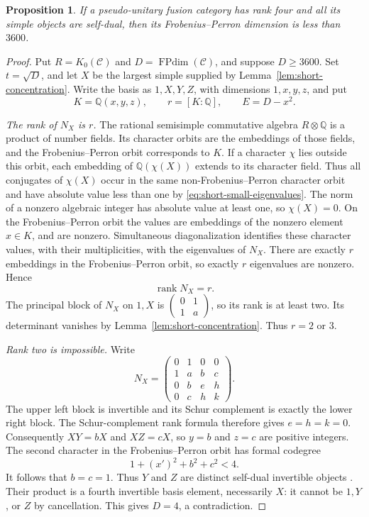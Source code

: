 \documentclass[11pt]{amsart}
\newtheorem{proposition}[theorem]{Proposition}
\theoremstyle{definition}
\DeclareMathOperator{\FPdim}{FPdim}
\newcommand{\Q}{\mathbb Q}
\numberwithin{equation}{section}
\begin{document}
\begin{proposition}\label{prop:pu}
If a pseudo-unitary fusion category has rank four and all its simple objects are self-dual, then its Frobenius--Perron dimension is less than $3600$.
\end{proposition}
\begin{proof}
Put $R=K_0(\mathcal C)$ and $D=\FPdim(\mathcal C)$, and suppose
$D\geq3600$.
Set $t=\sqrt D$, and let $X$ be the largest simple supplied by Lemma~\ref{lem:short-concentration}. Write the basis as $1,X,Y,Z$, with dimensions $1,x,y,z$, and put
\[
 K=\Q(x,y,z),\qquad r=[K:\Q],\qquad E=D-x^2.
\]

\smallskip\noindent
\emph{The rank of $N_X$ is $r$.}
The rational semisimple commutative algebra $R\otimes\Q$ is a product of number fields. Its character orbits are the embeddings of those fields, and the Frobenius--Perron orbit corresponds to $K$. If a character $\chi$ lies outside this orbit, each embedding of
$\Q(\chi(X))$ extends to its character field. Thus all conjugates of
$\chi(X)$ occur in the same non-Frobenius--Perron character orbit and
have absolute value less than one by \eqref{eq:short-small-eigenvalues}.
The norm of a nonzero algebraic integer has absolute value at least one,
so $\chi(X)=0$. On the Frobenius--Perron orbit the values are embeddings of the nonzero element $x\in K$, and are nonzero. Simultaneous diagonalization identifies these
character values, with their multiplicities, with the eigenvalues of
$N_X$. There are exactly $r$ embeddings in the Frobenius--Perron orbit,
so exactly $r$ eigenvalues are nonzero. Hence
\begin{equation}\label{eq:rank-degree}
 \operatorname{rank} N_X=r.
\end{equation}
The principal block of $N_X$ on $1,X$ is
$\left(\begin{smallmatrix}0&1\\1&a\end{smallmatrix}\right)$, so its rank is at least two. Its determinant vanishes by Lemma~\ref{lem:short-concentration}. Thus $r=2$ or $3$.

\smallskip\noindent
\emph{Rank two is impossible.}
Write
\[
 N_X=\begin{pmatrix}
 0&1&0&0\\
 1&a&b&c\\
 0&b&e&h\\
 0&c&h&k
 \end{pmatrix}.
\]
The upper left block is invertible and its Schur complement is exactly the lower right block. The Schur-complement rank formula \cite[\S0.8.5(b)]{HornJohnson}
therefore gives $e=h=k=0$. Consequently $XY=bX$ and $XZ=cX$, so $y=b$ and $z=c$ are positive integers. The second character in the Frobenius--Perron orbit has formal codegree
\[
 1+(x')^2+b^2+c^2<4.
\]
It follows that $b=c=1$. Thus $Y$ and $Z$ are distinct self-dual invertible objects
\cite[Corollary~3.3.10]{EGNO}. Their product is a fourth invertible basis element, necessarily $X$: it cannot be $1,Y$, or $Z$ by cancellation. This gives $D=4$, a contradiction.


\end{proof}
\end{document}
